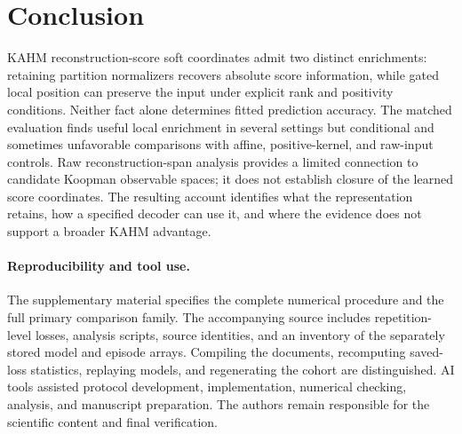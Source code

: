 \section{Conclusion}
KAHM reconstruction-score soft coordinates admit two distinct enrichments: retaining partition normalizers recovers absolute score information, while gated local position can preserve the input under explicit rank and positivity conditions. Neither fact alone determines fitted prediction accuracy. The matched evaluation finds useful local enrichment in several settings but conditional and sometimes unfavorable comparisons with affine, positive-kernel, and raw-input controls. Raw reconstruction-span analysis provides a limited connection to candidate Koopman observable spaces; it does not establish closure of the learned score coordinates. The resulting account identifies what the representation retains, how a specified decoder can use it, and where the evidence does not support a broader KAHM advantage.

\paragraph{Reproducibility and tool use.}
The supplementary material specifies the complete numerical procedure and the full primary comparison family. The accompanying source includes repetition-level losses, analysis scripts, source identities, and an inventory of the separately stored model and episode arrays. Compiling the documents, recomputing saved-loss statistics, replaying models, and regenerating the cohort are distinguished. AI tools assisted protocol development, implementation, numerical checking, analysis, and manuscript preparation. The authors remain responsible for the scientific content and final verification.
